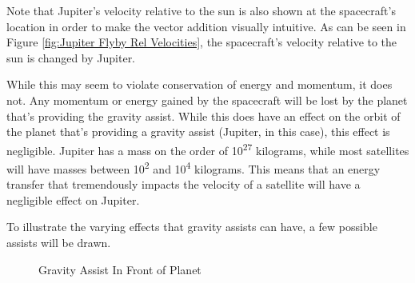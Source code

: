 \documentclass[../basicOrbitalDynamics.tex]{subfiles}
\begin{document}
Note that Jupiter's velocity relative to the sun is also shown at the spacecraft's location in order to make the vector addition visually intuitive. As can be seen in Figure \ref{fig:Jupiter Flyby Rel Velocities}, the spacecraft's velocity relative to the sun is changed by Jupiter.

While this may seem to violate conservation of energy and momentum, it does not. Any momentum or energy gained by the spacecraft will be lost by the planet that's providing the gravity assist. While this does have an effect on the orbit of the planet that's providing a gravity assist (Jupiter, in this case), this effect is negligible. Jupiter has a mass on the order of 10\textsuperscript{27} kilograms, while most satellites will have masses between 10\textsuperscript{2} and 10\textsuperscript{4} kilograms. This means that an energy transfer that tremendously impacts the velocity of a satellite will have a negligible effect on Jupiter.

To illustrate the varying effects that gravity assists can have, a few possible assists will be drawn.

\begin{figure}[H]
    \centering
    \caption{Gravity Assist In Front of Planet}\label{fig:Gravity Assist Ahead of Planet}
\end{figure}
\end{document}
